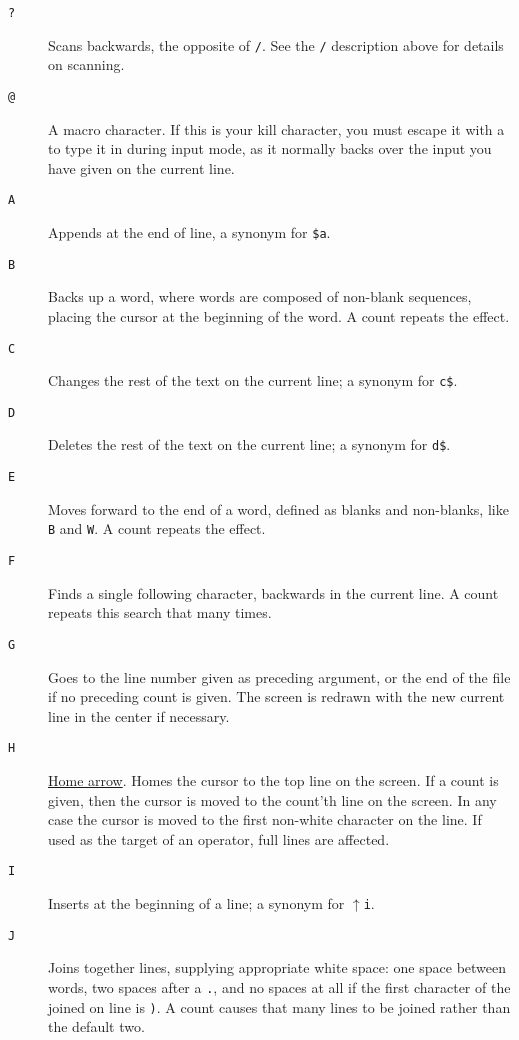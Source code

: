 \begin{description}
\item[{\tt ?}] Scans backwards, the opposite of {\tt /}. See the {\tt /}
description above for details on scanning.

\item[{\tt @}] A macro character. If this is your kill character, you must
escape it with a {\tt{}} to type it in during input mode, as it
normally backs over the input you have given on the current line.

\item[{\tt A}] Appends at the end of line, a synonym for {\tt \$a}.

\item[{\tt B}] Backs up a word, where words are composed of non-blank
sequences, placing the cursor at the beginning of the word. A count repeats
the effect.

\item[{\tt C}] Changes the rest of the text on the current line; a synonym for
{\tt c\$}.

\item[{\tt D}] Deletes the rest of the text on the current line; a synonym for
{\tt d\$}.

\item[{\tt E}] Moves forward to the end of a word, defined as blanks and
non-blanks, like {\tt B} and {\tt W}. A count repeats the effect.

\item[{\tt F}] Finds a single following character, backwards in the current
line. A count repeats this search that many times.

\item[{\tt G}] Goes to the line number given as preceding argument, or the end
of the file if no preceding count is given. The screen is redrawn with the new
current line in the center if necessary.

\item[{\tt H}] \ul{Home arrow}. Homes the cursor to the top line on the
screen. If a count is given, then the cursor is moved to the count'th line on
the screen. In any case the cursor is moved to the first non-white character
on the line.  If used as the target of an operator, full lines are affected.

\item[{\tt I}] Inserts at the beginning of a line; a synonym for
$\uparrow${\tt i}.

\item[{\tt J}] Joins together lines, supplying appropriate white space: one
space between words, two spaces after a {\tt .}, and no spaces at all if the
first character of the joined on line is {\tt )}.  A count causes that many
lines to be joined rather than the default two.


\end{description}
